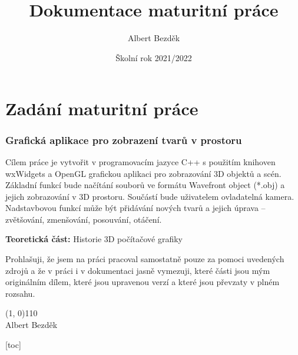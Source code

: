 \documentclass[a4paper, 11pt]{report}
\begin{document}
\hfuzz=1pt
\title{
    {\fontsize{65}{75}} \\ [0.7cm]
    {\huge Dokumentace maturitní práce}
}
\author{\huge Albert Bezděk}
\date{Školní rok 2021/2022}
\maketitle
{}

\chapter*{Zadání maturitní práce}
\subsection*{Grafická aplikace pro zobrazení tvarů v prostoru}
Cílem práce je vytvořit v programovacím jazyce C++ s použitím knihoven wxWidgets a OpenGL grafickou aplikaci pro zobrazování 3D objektů a scén. Základní funkcí bude načítání souborů ve formátu Wavefront object (*.obj) a jejich zobrazování v 3D prostoru. Součástí bude uživatelem ovladatelná kamera. Nadstavbovou funkcí může být přidávání nových tvarů a jejich úprava – zvětšování, zmenšování, posouvání, otáčení.

\textbf{Teoretická část:} Historie 3D počítačové grafiky
\thispagestyle{withouthdr}

\pagebreak
\thispagestyle{withouthdr}
\hspace{0pt}
\vfill
Prohlašuji, že jsem na práci pracoval samostatně pouze za pomoci uvedených zdrojů a že v práci i v dokumentaci jasně vymezuji, které části jsou mým originálním dílem, které jsou upravenou verzí a které jsou převzaty v plném rozsahu.
\bigskip
\begin{flushright}
    \line(1, 0){110}\\
    Albert Bezděk
\end{flushright}
\vfill
\hspace{0pt}

\clearpage
{
    \setlength{\parskip}{\tocparskip}
    \pagestyle{toc}
    [toc]{}
    \tableofcontents
    \thispagestyle{toc}
}
\end{document}
